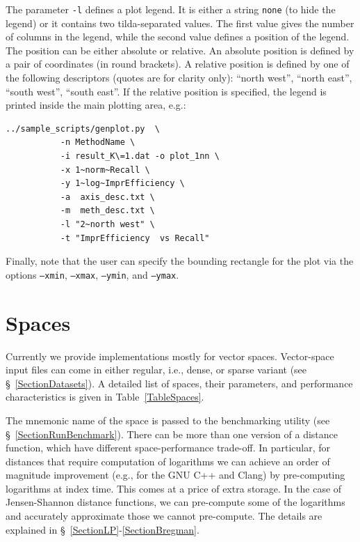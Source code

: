 \documentclass[runningheads,a4paper]{llncs}
\newcommand{\ttt}[1]{\texttt{#1}}
\begin{document}
{The parameter \ttt{-l} defines a plot legend.
It is either a string \ttt{none} (to hide the legend) 
or  it contains two tilda-separated values.
The first value gives the number of columns in the legend, while the second value
defines a position of the legend. The position can be either 
absolute or relative.
An absolute position is defined by a pair of coordinates (in round brackets).
A relative position is defined by one of the following descriptors 
(quotes are for clarity only): ``north west'', ``north east'', ``south west'', ``south east''.
If the relative position is specified, the legend is printed inside the main
plotting area, e.g.:
\begin{verbatim}
../sample_scripts/genplot.py  \
           -n MethodName \
           -i result_K\=1.dat -o plot_1nn \
           -x 1~norm~Recall \
           -y 1~log~ImprEfficiency \
           -a  axis_desc.txt \
           -m  meth_desc.txt \
           -l "2~north west" \
           -t "ImprEfficiency  vs Recall"
\end{verbatim}

Finally, note that the user can specify the bounding rectangle for the plot
via the options \ttt{--xmin}, \ttt{--xmax}, \ttt{--ymin}, and \ttt{--ymax}.

\section{Spaces}\label{SectionSpaces}
Currently we provide implementations mostly for vector spaces.
Vector-space input files can come in either regular, i.e., dense,
or sparse variant (see \S~\ref{SectionDatasets}). 
A detailed list of spaces, their parameters, 
and performance characteristics is given in Table~\ref{TableSpaces}.

The mnemonic name of the space is passed to the benchmarking utility (see \S~\ref{SectionRunBenchmark}).
There can be more than one version of a distance function,
which have different space-performance trade-off.
In particular, for distances that require computation of logarithms 
we can achieve an order of magnitude improvement (e.g., for the GNU C++
and Clang) by pre-computing
logarithms at index time. This comes at a price of extra storage. 
In the case of Jensen-Shannon distance functions, we can pre-compute some 
of the logarithms and accurately approximate those we cannot pre-compute.
The details are explained in \S~\ref{SectionLP}-\ref{SectionBregman}.

}
\end{document}
